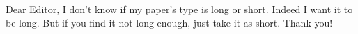 Dear Editor, I don't know if my paper's type is long or short. Indeed I want it to be long. But if you find it not long enough, just take it as short. Thank you!
